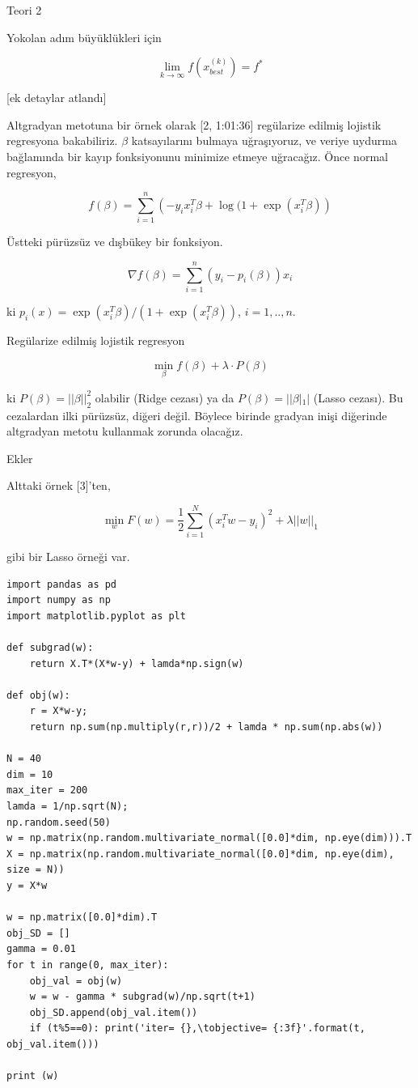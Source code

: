 \documentclass[12pt,fleqn]{article}\usepackage{../../common}
\begin{document}
Teori 2

Yokolan adım büyüklükleri için

$$
\lim_{k \to \infty} f(x_{best}^{(k)} ) = f^\ast 
$$

[ek detaylar atlandı]

Altgradyan metotuna bir örnek olarak [2, 1:01:36] regülarize edilmiş
lojistik regresyona bakabiliriz. $\beta$ katsayılarını bulmaya uğraşıyoruz,
ve veriye uydurma bağlamında bir kayıp fonksiyonunu minimize etmeye
uğracağız. Önce normal regresyon,

$$
f(\beta) = \sum_{i=1}^{n} \left(-y_ix_i^T\beta + \log( 1 + \exp (x_i^T\beta) \right) 
$$

Üstteki pürüzsüz ve dışbükey bir fonksiyon. 

$$
\nabla f(\beta) = \sum_{i=1}^{n} (y_i - p_i(\beta)) x_i
$$

ki $p_i(x) = \exp(x_i^T\beta) / (1+ \exp(x_i^T\beta))$, $i=1,..,n$. 

Regülarize edilmiş lojistik regresyon

$$
\min_\beta f(\beta) + \lambda \cdot P(\beta)
$$

ki $P(\beta) = ||\beta||_2^2$ olabilir (Ridge cezası) ya da
$P(\beta) = ||\beta|_1|$ (Lasso cezası). Bu cezalardan ilki pürüzsüz,
diğeri değil. Böylece birinde gradyan inişi diğerinde altgradyan metotu
kullanmak zorunda olacağız.

Ekler

Alttaki örnek [3]'ten,

$$
\min_w F(w) = \frac{1}{2} \sum_{i=1}^{N} (x_i^T w - y_i)^2 + \lambda ||w||_1
$$

gibi bir Lasso örneği var. 

\begin{verbatim}
import pandas as pd
import numpy as np
import matplotlib.pyplot as plt

def subgrad(w):
    return X.T*(X*w-y) + lamda*np.sign(w)

def obj(w):
    r = X*w-y;
    return np.sum(np.multiply(r,r))/2 + lamda * np.sum(np.abs(w))

N = 40
dim = 10
max_iter = 200
lamda = 1/np.sqrt(N);
np.random.seed(50)
w = np.matrix(np.random.multivariate_normal([0.0]*dim, np.eye(dim))).T
X = np.matrix(np.random.multivariate_normal([0.0]*dim, np.eye(dim), size = N))
y = X*w

w = np.matrix([0.0]*dim).T
obj_SD = []
gamma = 0.01
for t in range(0, max_iter):
    obj_val = obj(w)
    w = w - gamma * subgrad(w)/np.sqrt(t+1)
    obj_SD.append(obj_val.item())
    if (t%5==0): print('iter= {},\tobjective= {:3f}'.format(t, obj_val.item()))

print (w)
\end{verbatim}
\end{document}
